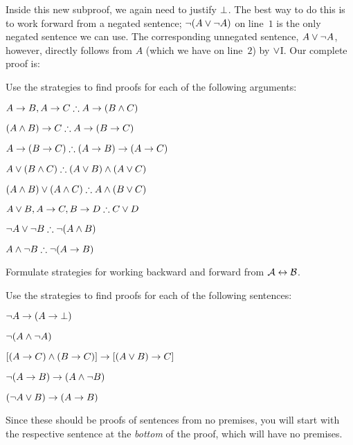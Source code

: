 Inside this new subproof, we again need to justify $\bot$. The best way to do this is to work forward from a negated sentence; $\neg(A \vee \neg A)$ on line~$1$ is the only negated sentence we can use. The corresponding unnegated sentence, $A \vee \neg A$, however, directly follows from $A$ (which we have on line~$2$) by $\vee$I. Our complete proof is:
\begin{fitchproof}
	\open
	\AS
	\open
	\AS
	\close
	\close
\end{fitchproof}

\practiceproblems

\problempart
Use the strategies to find proofs for each of the following arguments:
\begin{compactlist}
\item $A \eif B, A \eif C \therefore A \eif (B \eand C)$
\item $(A \eand B) \eif C \therefore A \eif (B \eif C)$
\item $A \eif (B \eif C) \therefore (A \eif B) \eif (A \eif C)$
\item $A \eor (B \eand C) \therefore (A \eor B) \eand (A \eor C)$
\item $(A \eand B) \eor (A \eand C) \therefore A \eand (B \eor C)$
\item $A \eor B, A \eif C, B \eif D \therefore C \eor D$
\item $\enot A \lor \enot B \therefore \enot(A \eand B)$
\item $A \eand \enot B \therefore \enot(A \eif B)$
\end{compactlist}

\problempart
Formulate strategies for working backward and forward from $\mathcal{A} \leftrightarrow \mathcal{B}$.

\problempart
Use the strategies to find proofs for each of the following sentences:
\begin{compactlist}
\item $\neg A \rightarrow (A \rightarrow \bot)$
\item $\neg(A \wedge \neg A)$
\item $[(A \rightarrow C) \wedge (B \rightarrow C)] \rightarrow [(A \lor B) \rightarrow C]$
\item $\neg(A \rightarrow B) \rightarrow (A \wedge \neg B)$
\item $(\neg A \vee B) \rightarrow (A \rightarrow B)$
\end{compactlist}
Since these should be proofs of sentences from no premises, you will start with the respective sentence at the \emph{bottom} of the proof, which will have no premises.

